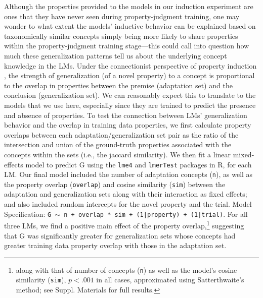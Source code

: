 \documentclass[10pt,letterpaper]{article}
\newcommand{\todo}[1]{\textcolor{purple}{$_{todo}$[#1]}}
\newcommand{\metric}{\mathrm{G}}
\begin{document}
Although the properties provided to the models in our induction experiment are ones that they have never seen during property-judgment training, one may wonder to what extent the models' inductive behavior can be explained based on taxonomically similar concepts simply being more likely to share properties within the property-judgment training stage---this could call into question how much these generalization patterns tell us about the underlying concept knowledge in the LMs.
Under the connectionist perspective of property induction \citep{sloman1993feature, rogers2004semantic}, the strength of generalization (of a novel property) to a concept is proportional to the overlap in properties between the premise (adaptation set) and the conclusion (generalization set).
We can reasonably expect this to translate to the models that we use here,
especially since they are trained to predict the presence and absence of properties.
To test the connection between LMs' generalization behavior and the overlap in training data properties, we first calculate property overlaps between each adaptation/generalization set pair as the ratio of the intersection and union of the ground-truth properties associated with the concepts within the sets (i.e., the jaccard similarity).
We then fit a linear mixed-effects model to predict $\metric$ using the \texttt{lme4} \citep{lme4} and \texttt{lmerTest} \citep{lmertest} packages in R, for each LM. 
Our final model included the number of adaptation concepts (\texttt{n}), as well as the property overlap (\texttt{overlap}) and cosine similarity (\texttt{sim}) between the adaptation and generalization sets along with their interaction as fixed effects; and also included random intercepts for the novel property and the trial. Model Specification: \texttt{G $\sim$ n + overlap * sim + (1|property) + (1|trial)}.
For all three LMs, we find a positive main effect of the property overlap,\footnote{along with that of number of concepts (\texttt{n}) as well as the model's cosine similarity (\texttt{sim}), $p < .001$ in all cases, approximated using Satterthwaite's method; see Suppl. Materials for full results.} suggesting that $\metric$ was significantly greater for generalization sets whose concepts had greater training data property overlap with those in the adaptation set.
\end{document}
